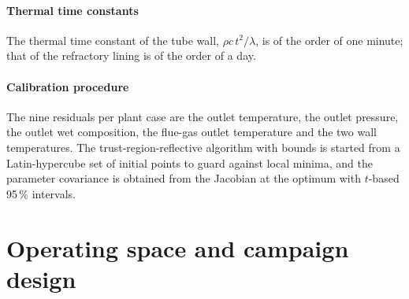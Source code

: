 \documentclass[final,3p,times]{elsarticle}
\begin{document}
\paragraph{Thermal time constants} The thermal time constant of the tube wall, $\rho c\,t^2/\lambda$, is of the order of one minute; that of the refractory lining is of the order of a day.

\paragraph{Calibration procedure} The nine residuals per plant case are the outlet temperature, the outlet pressure, the outlet wet composition, the flue-gas outlet temperature and the two wall temperatures. The trust-region-reflective algorithm with bounds is started from a Latin-hypercube set of initial points to guard against local minima, and the parameter covariance is obtained from the Jacobian at the optimum with $t$-based 95\,\% intervals.

\section{Operating space and campaign design}
\label{sec:ranges}
\end{document}
